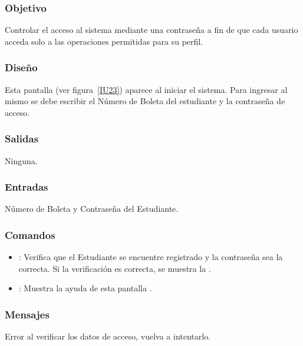 \subsubsection{Objetivo}
	Controlar el acceso al sistema mediante una contraseña a fin de que cada usuario acceda solo a las operaciones permitidas para su perfil.

\subsubsection{Diseño}
	Esta pantalla  (ver figura~\ref{IU23}) aparece al iniciar el sistema. Para ingresar al mismo se debe escribir el Número de Boleta del estudiante y la contraseña de acceso. 


\subsubsection{Salidas}

	Ninguna.

\subsubsection{Entradas}
Número de Boleta y Contraseña del Estudiante.

\subsubsection{Comandos}
\begin{itemize}
	\item {}: Verifica que el Estudiante se encuentre registrado y la contraseña sea la correcta. Si la verificación es correcta, se muestra la .
	\item {}: Muestra la ayuda de esta pantalla .
\end{itemize}

\subsubsection{Mensajes}

\begin{Citemize}
	\item Error al verificar los datos de acceso, vuelva a intentarlo.
\end{Citemize}



